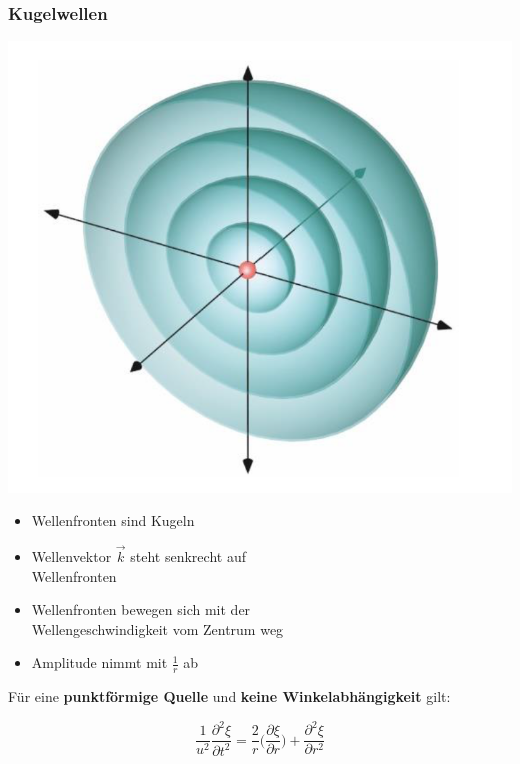 \subsubsection{Kugelwellen}

\begin{minipage}{0.3\linewidth}
\includegraphics[width=0.98\linewidth]{Bilder/Wellen-Optik/Kugel_Welle}
\end{minipage}
\hfill
\begin{minipage}{0.68\linewidth}

\begin{itemize}
	\item Wellenfronten sind Kugeln 
	\item Wellenvektor $\vec{k}$ steht senkrecht auf  \\
 		Wellenfronten 
	\item Wellenfronten bewegen sich mit der \\
		 Wellengeschwindigkeit vom Zentrum weg 
	\item Amplitude nimmt mit $\frac{1}{r}$ ab \\
\end{itemize}
\end{minipage}

Für eine \textbf{punktförmige Quelle} und \textbf{keine Winkelabhängigkeit} gilt:

$$ \boxed{ \frac{1}{u^2} \frac{\partial^2 \xi}{\partial t^2} = \frac{2}{r} \Big( \frac{\partial \xi}{\partial r} \Big) + \frac{\partial^2 \xi}{\partial r^2} }$$

